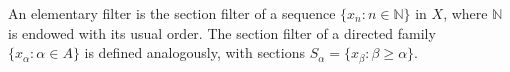 An elementary filter is the section filter of a sequence $\{x_n : n \in \mathbb{N}\}$ in $X$, where $\mathbb{N}$ is endowed with its usual order. The section filter of a directed family $\{x_\alpha : \alpha \in A\}$ is defined analogously, with sections $S_\alpha = \{x_\beta : \beta \geq \alpha\}$.
